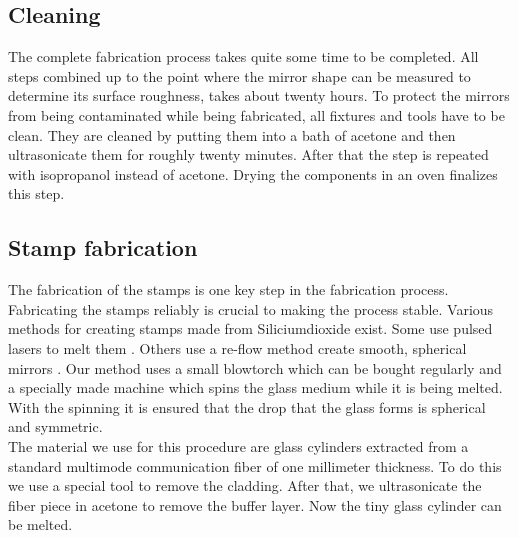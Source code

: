 \subsection{Cleaning}
The complete fabrication process takes quite some time to be completed. All steps combined up to the point where the mirror shape can be measured to determine its surface roughness, takes about twenty hours. To protect the mirrors from being contaminated while being fabricated, all fixtures and tools have to be clean. They are cleaned by putting them into a bath of acetone and then ultrasonicate them for roughly twenty minutes. After that the step is repeated with isopropanol instead of acetone. Drying the components in an oven finalizes this step.
\subsection{Stamp fabrication}\label{ChapStampFabrication}
The fabrication of the stamps is one key step in the fabrication process. Fabricating the stamps reliably is crucial to making the process stable. Various methods for creating stamps made from Siliciumdioxide exist. Some use pulsed lasers to melt them \cite{hasegawa2018fabrication}. Others use a re-flow method create smooth, spherical mirrors \cite{roy2011fabrication}. Our method uses a small blowtorch which can be bought regularly and a specially made machine which spins the glass medium while it is being melted. With the spinning it is ensured that the drop that the glass forms is spherical and symmetric.\\
The material we use for this procedure are glass cylinders extracted from a standard multimode communication fiber of one millimeter thickness. To do this we use a special tool to remove the cladding. After that, we ultrasonicate the fiber piece in acetone to remove the buffer layer. Now the tiny glass cylinder can be melted.
